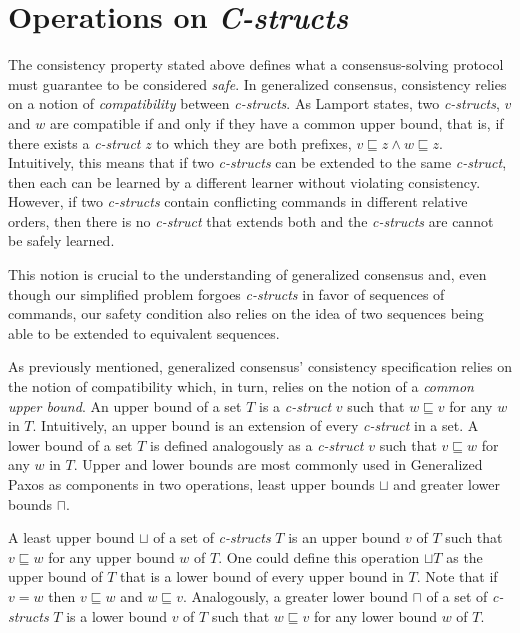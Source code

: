 \section{Operations on \textit{C-structs}} \label{Operations}
The consistency property stated above defines what a consensus-solving protocol must guarantee to be considered \textit{safe}. In generalized consensus, consistency relies on a notion of \textit{compatibility} between \textit{c-structs}. As Lamport states, two \textit{c-structs}, $v$ and $w$ are compatible if and only if they have a common upper bound, that is, if there exists a \textit{c-struct} $z$ to which they are both prefixes, $v \sqsubseteq z \land w \sqsubseteq z$. Intuitively, this means that if two \textit{c-structs} can be extended to the same \textit{c-struct}, then each can be learned by a different learner without violating consistency. However, if two \textit{c-structs} contain conflicting commands in different relative orders, then there is no \textit{c-struct} that extends both and the \textit{c-structs} are cannot be safely learned. {\color{red}This notion is crucial to the understanding of generalized consensus and, even though our simplified problem forgoes \textit{c-structs} in favor of sequences of commands, our safety condition also relies on the idea of two sequences being able to be extended to equivalent sequences.\par
As previously mentioned, generalized consensus' consistency specification relies on the notion of compatibility which, in turn, relies on the notion of a \textit{common upper bound}. An upper bound of a set $T$ is a \textit{c-struct} $v$ such that $w \sqsubseteq v$ for any $w$ in $T$. Intuitively, an upper bound is an extension of every \textit{c-struct} in a set. A lower bound of a set $T$ is defined analogously as a \textit{c-struct} $v$ such that $v \sqsubseteq w$ for any $w$ in $T$. Upper and lower bounds are most commonly used in Generalized Paxos as components in two operations, least upper bounds $\sqcup$ and greater lower bounds $\sqcap$.} A least upper bound $\sqcup$ of a set of \textit{c-structs} $T$ is an upper bound $v$ of $T$ such that $v \sqsubseteq w$ for any upper bound $w$ of $T$. One could define this operation $\sqcup T$ as the upper bound of $T$ that is a lower bound of every upper bound in $T$. Note that if $v = w$ then $v\sqsubseteq w$ and $w\sqsubseteq v$. Analogously, a greater lower bound $\sqcap$ of a set of \textit{c-structs} $T$ is a lower bound $v$ of $T$ such that $w \sqsubseteq v$ for any lower bound $w$ of $T$. \par
